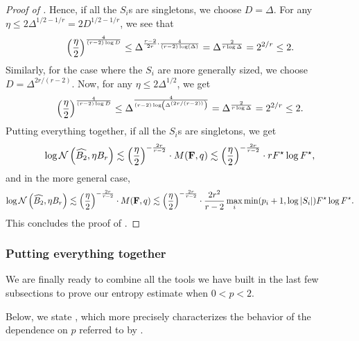 \documentclass[11pt]{article}
\numberwithin{equation}{section}
\begin{document}
\begin{proof}[Proof of ]
Hence, if all the $S_i$s are singletons, we choose $D = \Delta$. For any $\eta \le 2\Delta^{1/2-1/r} = 2D^{1/2-1/r}$, we see that
\begin{align*}
    \left(\frac{\eta}{2}\right)^{\frac{4}{(r-2)\log D}} \le \Delta^{\frac{r-2}{2r} \cdot \frac{4}{(r-2)\log\left(\Delta\right)}} = \Delta^{\frac{2}{r\log\Delta}} = 2^{2/r} \le 2.
\end{align*}
Similarly, for the case where the $S_i$ are more generally sized, we choose $D = \Delta^{2r/(r-2)}$. Now, for any $\eta \le 2\Delta^{1/2}$, we get
\begin{align*}
    \left(\frac{\eta}{2}\right)^{\frac{4}{(r-2)\log D}} \le \Delta^{\frac{4}{(r-2)\log\left(\Delta^{(2r/(r-2))}\right)}} = \Delta^{\frac{2}{r\log\Delta}} = 2^{2/r} \le 2.
\end{align*}
Putting everything together, if all the $S_i$s are singletons, we get
\begin{align*}
    \log\mathcal{N}\left(\widehat{B_2}, \eta B_r\right) \lesssim \left(\frac{\eta}{2}\right)^{-\frac{2r}{r-2}} \cdot M(\mathbf{F},q) \lesssim \left(\frac{\eta}{2}\right)^{-\frac{2r}{r-2}} \cdot rF^{\star}\log F^{\star},
\end{align*}
and in the more general case,
\begin{align*}
    \log\mathcal{N}\left(\widehat{B_2}, \eta B_r\right) \lesssim \left(\frac{\eta}{2}\right)^{-\frac{2r}{r-2}} \cdot M(\mathbf{F},q) \lesssim \left(\frac{\eta}{2}\right)^{-\frac{2r}{r-2}} \cdot \frac{2r^2}{r-2}\max_i \min(p_i+1, \log\left\lvert S_i \right\rvert)F^{\star}\log F^{\star}.
\end{align*}
This concludes the proof of .
\end{proof}

\subsubsection{Putting everything together}

We are finally ready to combine all the tools we have built in the last few subsections to prove our entropy estimate when $0 < p < 2$.

Below, we state , which more precisely characterizes the behavior of the dependence on $p$ referred to by . 
\end{document}
